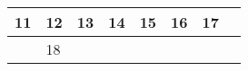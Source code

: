 {\begin{tabularx}{\linewidth}{|l!{\vrule width \myLenLineThicknessThick}*{7}{@{}X@{}|}}
      
      
        \begin{minipage}[t]{6mm}\centering{}11\end{minipage}
      
       & 
    
      
      
        \begin{minipage}[t]{6mm}\centering{}12\end{minipage}
      
       & 
    
      
      
        \begin{minipage}[t]{6mm}\centering{}13\end{minipage}
      
       & 
    
      
      
        \begin{minipage}[t]{6mm}\centering{}14\end{minipage}
      
       & 
    
      
      
        \begin{minipage}[t]{6mm}\centering{}15\end{minipage}
      
       & 
    
      
      
        \begin{minipage}[t]{6mm}\centering{}16\end{minipage}
      
       & 
    
      
      
        \begin{minipage}[t]{6mm}\centering{}17\end{minipage}
      
      
        \\  \hline 
      
    
  
  
  
  \hyperlink{week-2027-42}{} &
    
      
      
        \begin{minipage}[t]{6mm}\centering{}18\end{minipage}
      

\end{tabularx}}
